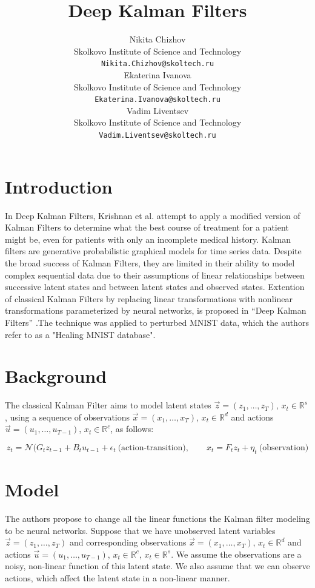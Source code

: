\documentclass{article}
\title{Deep Kalman Filters}
\author{
    Nikita Chizhov \\
    Skolkovo Institute of Science and Technology\\
    \texttt{Nikita.Chizhov@skoltech.ru} \\
   \And
    Ekaterina Ivanova \\
    Skolkovo Institute of Science and Technology\\
    \texttt{Ekaterina.Ivanova@skoltech.ru} \\
  \And
    Vadim Liventsev \\
    Skolkovo Institute of Science and Technology\\
    \texttt{Vadim.Liventsev@skoltech.ru} \\
}
\begin{document}
\maketitle




\section{Introduction}
In Deep Kalman Filters, Krishnan et al. attempt to apply a modified version of Kalman Filters to determine what the best course of treatment for a patient might be, even for patients with only an incomplete medical history. Kalman filters are generative probabilistic graphical models for time series data. Despite the broad success of Kalman Filters, they are limited in their ability to model complex sequential data due to their assumptions of linear relationships between successive latent states and between latent states and observed states. Extention of classical Kalman Filters by replacing linear transformations with nonlinear transformations parameterized by neural networks, is proposed in ``Deep Kalman Filters'' \cite{krishnan2015deep}.The technique was applied to perturbed MNIST data, which the authors refer to as a "Healing MNIST database".

\section{Background}

The classical Kalman Filter aims to model latent states $\vec{z} = (z_1, \dots, z_T)$, $x_t\in\mathbb{R}^s$, using a sequence of observations $\vec{x} = (x_1, \dots, x_T)$, $x_t\in\mathbb{R}^d$ and actions $\vec{u} = (u_1, \dots, u_{T-1})$, $x_t\in\mathbb{R}^c$, as follows:

\begin{equation}
z_t =\mathcal{N}(G_tz_{t-1} + B_tu_{t-1} + \epsilon_t ~ \text{(action-transition)}, \qquad
x_t=F_tz_t + \eta_t ~ \text{(observation)}
\end{equation}

\section{Model}
The authors propose to change all the linear functions the Kalman filter modeling to be neural networks. Suppose that we have unobserved latent variables $\vec{z} = (z_1, \dots, z_T)$ and corresponding observations $\vec{x} = (x_1, \dots, x_T)$, $x_t\in\mathbb{R}^d$ and actions $\vec{u} = (u_1, \dots, u_{T-1})$, $x_t\in\mathbb{R}^c$,  $x_t\in\mathbb{R}^s$. We assume the observations are a noisy, non-linear function of this latent state. We also assume that we can observe actions, which affect the latent state in a
non-linear manner.
\end{document}
